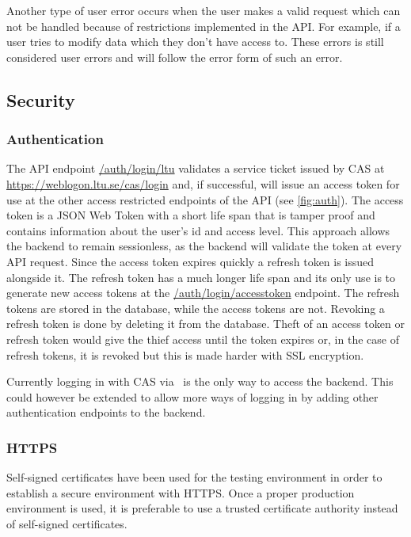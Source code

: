 Another type of user error occurs when the user makes a valid request which can not be handled because of restrictions implemented in the API. For example, if a user tries to modify data which they don't have access to. These errors is still considered user errors and will follow the error form of such an error.

\subsection{Security}

\subsubsection{Authentication}
The API endpoint \url{/auth/login/ltu} validates a service ticket issued by CAS at \url{https://weblogon.ltu.se/cas/login} and, if successful, will issue an access token for use at the other access restricted endpoints of the API (see \ref{fig:auth}). The access token is a JSON Web Token with a short life span that is tamper proof and contains information about the user's id and access level. This approach allows the backend to remain sessionless, as the backend will validate the token at every API request. Since the access token expires quickly a refresh token is issued alongside it. The refresh token has a much longer life span and its only use is to generate new access tokens at the \url{/auth/login/accesstoken} endpoint. The refresh tokens are stored in the database, while the access tokens are not. Revoking a refresh token is done by deleting it from the database. Theft of an access token or refresh token would give the thief access until the token expires or, in the case of refresh tokens, it is revoked but this is made harder with SSL encryption.

Currently logging in with CAS via \LTU\ is the only way to access the backend. This could however be extended to allow more ways of logging in by adding other authentication endpoints to the backend.

\subsubsection{HTTPS} \label{https}
Self-signed certificates have been used for the testing environment in order to establish a secure environment with HTTPS. Once a proper production environment is used, it is preferable to use a trusted certificate authority instead of self-signed certificates.

